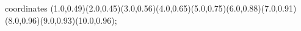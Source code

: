 					coordinates { (1.0,0.49)(2.0,0.45)(3.0,0.56)(4.0,0.65)(5.0,0.75)(6.0,0.88)(7.0,0.91)(8.0,0.96)(9.0,0.93)(10.0,0.96)};